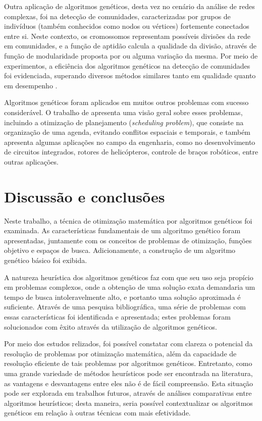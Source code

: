 \documentclass[12pt]{article}
\begin{document}
Outra aplicação de algoritmos genéticos, desta vez no cenário da análise de redes complexas, foi na detecção de comunidades, caracterizadas por grupos de indivíduos (também conhecidos como nodos ou vértices) fortemente conectados entre si. Neste contexto, os cromossomos representam possíveis divisões da rede em comunidades, e a função de aptidão calcula a qualidade da divisão, através de função de modularidade proposta por \cite{Newman2004} ou alguma variação da mesma. Por meio de experimentos, a eficiência dos algoritmos genéticos na detecção de comunidades foi evidenciada, superando diversos métodos similares tanto em qualidade quanto em desempenho \cite{Tasgin2007,Pizzuti2008}.

Algoritmos genéticos foram aplicados em muitos outros problemas com sucesso considerável. O trabalho de \cite{Ross1994} apresenta uma visão geral sobre esses problemas, incluindo a otimização de planejamento (\textit{scheduling problem}), que consiste na organização de uma agenda, evitando conflitos espaciais e temporais, e também apresenta algumas aplicações no campo da engenharia, como no desenvolvimento de circuitos integrados, rotores de helicópteros, controle de braços robóticos, entre outras aplicações.

\section{Discussão e conclusões} \label{sec:conclusions}

Neste trabalho, a técnica de otimização matemática por algoritmos genéticos foi examinada. As características fundamentais de um algoritmo genético foram apresentadas, juntamente com os conceitos de problemas de otimização, funções objetivo e espaços de busca. Adicionamente, a construção de um algoritmo genético básico foi exibida.

A natureza heurística dos algoritmos genéticos faz com que seu uso seja propício em problemas complexos, onde a obtenção de uma solução exata demandaria um tempo de busca intoleravelmente alto, e portanto uma solução aproximada é suficiente. Através de uma pesquisa bibliográfica, uma série de problemas com essas características foi identificada e apresentada; estes problemas foram solucionados com êxito através da utilização de algoritmos genéticos.

Por meio dos estudos relizados, foi possível constatar com clareza o potencial da resolução de problemas por otimização matemática, além da capacidade de resolução eficiente de tais problemas por algoritmos genéticos. Entretanto, como uma grande variedade de métodos heurísticos pode ser encontrada na literatura, as vantagens e desvantagens entre eles não é de fácil compreensão. Esta situação pode ser explorada em trabalhos futuros, através de análises comparativas entre algoritmos heurísticos; desta maneira, seria possível contextualizar os algoritmos genéticos em relação à outras técnicas com mais efetividade.



\end{document}
